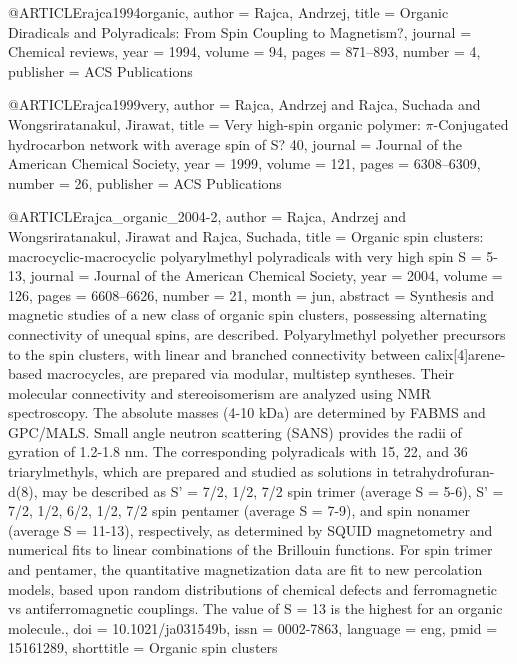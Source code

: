@ARTICLE{rajca1994organic,
  author = {Rajca, Andrzej},
  title = {Organic Diradicals and Polyradicals: From Spin Coupling to Magnetism?},
  journal = {Chemical reviews},
  year = {1994},
  volume = {94},
  pages = {871--893},
  number = {4},
  publisher = {ACS Publications}
}

@ARTICLE{rajca1999very,
  author = {Rajca, Andrzej and Rajca, Suchada and Wongsriratanakul, Jirawat},
  title = {Very high-spin organic polymer: $\pi$-Conjugated hydrocarbon network
	with average spin of S? 40},
  journal = {Journal of the American Chemical Society},
  year = {1999},
  volume = {121},
  pages = {6308--6309},
  number = {26},
  publisher = {ACS Publications}
}

@ARTICLE{rajca_organic_2004-2,
  author = {Rajca, Andrzej and Wongsriratanakul, Jirawat and Rajca, Suchada},
  title = {Organic spin clusters: macrocyclic-macrocyclic polyarylmethyl polyradicals
	with very high spin {S} = 5-13},
  journal = {Journal of the American Chemical Society},
  year = {2004},
  volume = {126},
  pages = {6608--6626},
  number = {21},
  month = jun,
  abstract = {Synthesis and magnetic studies of a new class of organic spin clusters,
	possessing alternating connectivity of unequal spins, are described.
	Polyarylmethyl polyether precursors to the spin clusters, with linear
	and branched connectivity between calix[4]arene-based macrocycles,
	are prepared via modular, multistep syntheses. Their molecular connectivity
	and stereoisomerism are analyzed using NMR spectroscopy. The absolute
	masses (4-10 kDa) are determined by FABMS and GPC/MALS. Small angle
	neutron scattering (SANS) provides the radii of gyration of 1.2-1.8
	nm. The corresponding polyradicals with 15, 22, and 36 triarylmethyls,
	which are prepared and studied as solutions in tetrahydrofuran-d(8),
	may be described as S' = 7/2, 1/2, 7/2 spin trimer (average S = 5-6),
	S' = 7/2, 1/2, 6/2, 1/2, 7/2 spin pentamer (average S = 7-9), and
	spin nonamer (average S = 11-13), respectively, as determined by
	SQUID magnetometry and numerical fits to linear combinations of the
	Brillouin functions. For spin trimer and pentamer, the quantitative
	magnetization data are fit to new percolation models, based upon
	random distributions of chemical defects and ferromagnetic vs antiferromagnetic
	couplings. The value of S = 13 is the highest for an organic molecule.},
  doi = {10.1021/ja031549b},
  issn = {0002-7863},
  language = {eng},
  pmid = {15161289},
  shorttitle = {Organic spin clusters}
}

